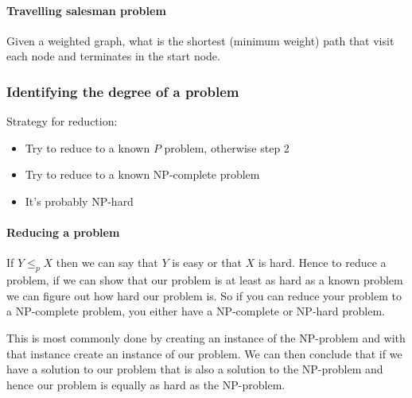 \documentclass[12pt]{article} %
\begin{document}
\paragraph{Travelling salesman problem}
Given a weighted graph, what is the shortest (minimum weight) path that visit each node and terminates in the start node.

\subsubsection{Identifying the degree of a problem}
Strategy for reduction:
\begin{itemize}
    \item Try to reduce to a known $P$ problem, otherwise step 2
    \item Try to reduce to a known NP-complete problem
    \item It's probably NP-hard
\end{itemize}

\paragraph{Reducing a problem}
If $Y \leq_{p} X$  then we can say that $Y$ is easy or that $X$ is hard. Hence to reduce a problem, if we can show that our problem is at least as hard as a known problem we can figure out how hard our problem is. So if you can reduce your problem to a NP-complete problem, you either have a NP-complete or NP-hard problem.

\par This is most commonly done by creating an instance of the NP-problem and with that instance create an instance of our problem. We can then conclude that if we have a solution to our problem that is also a solution to the NP-problem and hence our problem is equally as hard as the NP-problem.
\end{document}
